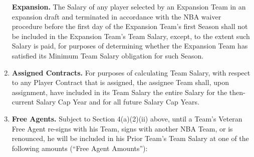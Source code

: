 \documentclass[
]{book}
\begin{document}
\begin{enumerate}
  \textbf{Expansion.} The Salary of any player selected by an Expansion Team in an expansion draft and terminated in accordance with the NBA waiver procedure before the first day of the Expansion Team's first Season shall not be included in the Expansion Team's Team Salary, except, to the extent such Salary is paid, for purposes of determining whether the Expansion Team has satisfied its Minimum Team Salary obligation for such Season.
\item
  \textbf{Assigned Contracts.} For purposes of calculating Team Salary, with respect to any Player Contract that is assigned, the assignee Team shall, upon assignment, have included in its Team Salary the entire Salary for the then-current Salary Cap Year and for all future Salary Cap Years.
\item
  \textbf{Free Agents.} Subject to Section 4(a)(2)(ii) above, until a Team's Veteran Free Agent re-signs with his Team, signs with another NBA Team, or is renounced, he will be included in his Prior Team's Team Salary at one of the following amounts (``Free Agent Amounts''):


\end{enumerate}
\end{document}
